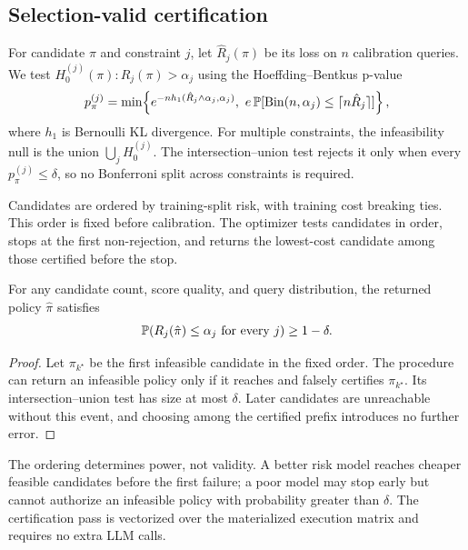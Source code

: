 \subsection{Selection-valid certification}
\label{sec:certification}

For candidate $\pi$ and constraint $j$, let $\hat R_j(\pi)$ be its loss on
$n$ calibration queries. We test
$H_0^{(j)}(\pi):R_j(\pi)>\alpha_j$ using the Hoeffding--Bentkus
p-value~\cite{bentkus2004hoeffding,angelopoulos2021ltt}
\[
p_\pi^{(j)}=\min\!\left\{
e^{-n h_1(\hat R_j\wedge\alpha_j,\alpha_j)},\
e\,\mathbb{P}[\mathrm{Bin}(n,\alpha_j)\leq\lceil n\hat R_j\rceil]
\right\},
\]
where $h_1$ is Bernoulli KL divergence. For multiple constraints, the
infeasibility null is the union $\bigcup_jH_0^{(j)}$. The
intersection--union test rejects it only when every $p_\pi^{(j)}\leq
\delta$, so no Bonferroni split across constraints is required.

Candidates are ordered by training-split risk, with training cost breaking
ties. This order is fixed before calibration. The optimizer tests candidates
in order, stops at the first non-rejection, and returns the lowest-cost
candidate among those certified before the stop.

\begin{theorem}
\label{thm:validity}
For any candidate count, score quality, and query distribution, the
returned policy $\hat\pi$ satisfies
\[
\mathbb{P}\!\left(R_j(\hat\pi)\leq\alpha_j\ \text{for every }j\right)
\geq1-\delta .
\]
\end{theorem}
\begin{proof}
Let $\pi_{k^\star}$ be the first infeasible candidate in the fixed order.
The procedure can return an infeasible policy only if it reaches and
falsely certifies $\pi_{k^\star}$. Its intersection--union test has size at
most $\delta$. Later candidates are unreachable without this event, and
choosing among the certified prefix introduces no further error.
\end{proof}

The ordering determines power, not validity. A better risk model reaches
cheaper feasible candidates before the first failure; a poor model may
stop early but cannot authorize an infeasible policy with probability
greater than $\delta$. The certification pass is vectorized over the
materialized execution matrix and requires no extra LLM calls.
